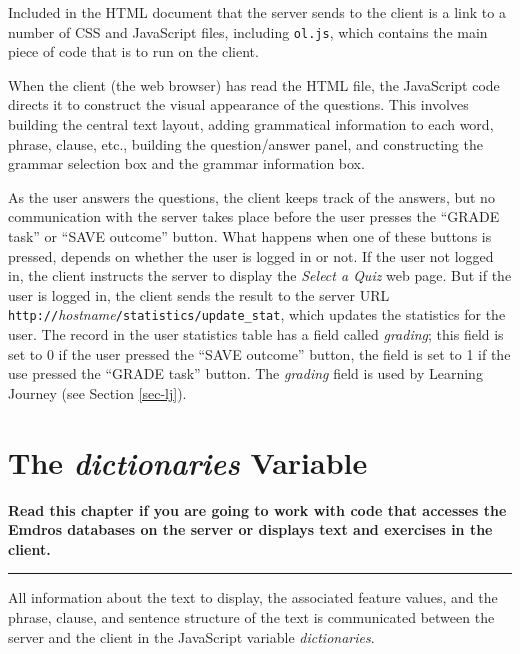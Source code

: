 \documentclass[11pt,oneside,a4paper]{memoir}
\begin{document}
Included in the HTML document that the server sends to the client is a link to a number of CSS and
JavaScript files, including \texttt{ol.js}, which contains the main piece of code that is to run on
the client.

When the client (the web browser) has read the HTML file, the JavaScript code directs it to
construct the visual appearance of the questions. This involves building the central text layout,
adding grammatical information to each word, phrase, clause, etc., building the question/answer
panel, and constructing the grammar selection box and the grammar
information box.

As the user answers the questions, the client keeps track of the answers, but no communication with
the server takes place before the user presses the
``GRADE task''
or ``SAVE outcome'' button. What
happens when one of these buttons is pressed, depends on whether the user is logged in or not. If
the user not logged in, the client instructs the server to display the \emph{Select a Quiz} web
page. But if the user is logged in, the client sends the result to the server URL
\texttt{http://}\textit{hostname}\texttt{/statistics/update\_stat}, which updates the
statistics for the user. The record in the user statistics table has a field
called \emph{grading}; this field is set to 0 if the user pressed the ``SAVE outcome'' button, the
field is set to 1 if the use pressed the ``GRADE task'' button. The \emph{grading} field is used by
Learning Journey (see Section \ref{sec-lj}).



\chapter{The \emph{dictionaries} Variable}\label{chap-dictionary}%

\textbf{Read this chapter if you are going to work with code that accesses the Emdros databases on
  the server or displays text and exercises in the client.}
\plainbreak{3}

All information about the text to display, the associated feature values, and the phrase, clause,
and sentence structure of the text is communicated between the server and the client in the
JavaScript variable \emph{dictionaries}.
\end{document}

